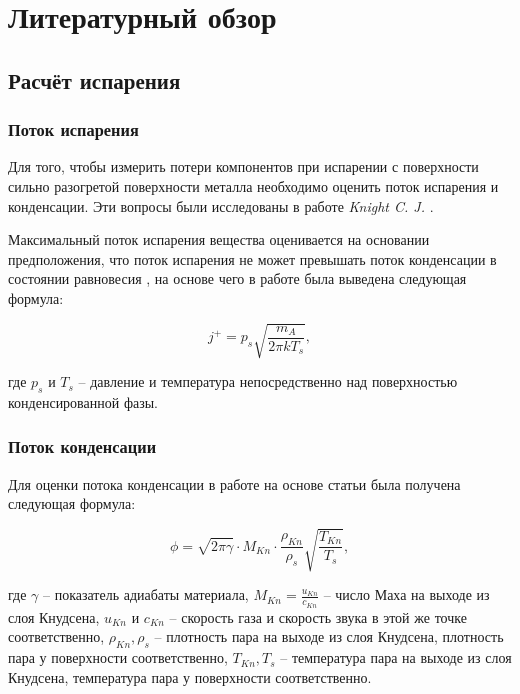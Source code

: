 \section{Литературный обзор}

\subsection{Расчёт испарения}

\subsubsection{Поток испарения}

Для того, чтобы измерить потери компонентов при испарении с поверхности сильно разогретой поверхности металла необходимо оценить поток испарения и конденсации. 
Эти вопросы были исследованы в работе \textit{Knight C. J.} \cite{knight1979theoretical}. 

Максимальный поток испарения вещества оценивается на основании предположения, что поток испарения не может превышать поток конденсации в состоянии равновесия \cite{hertz1882ueber}, на основе чего в работе \cite{langmuir1913vapor} была выведена следующая формула:

\begin{equation}
\label{eq:evap_max}
    j^+ = p_s\sqrt{\frac{m_A}{2\pi k T_s}},
\end{equation} 

где $p_s$ и $T_s$ -- давление и температура непосредственно над поверхностью конденсированной фазы.

\subsubsection{Поток конденсации}

Для оценки потока конденсации в работе \cite{klassen2018simulation} на основе статьи \cite{knight1979theoretical} была получена следующая формула:

\begin{equation}
    \label{eq:evap_coeff}
    \phi = \sqrt{2\pi\gamma} \cdot M_{Kn} \cdot \frac{\rho_{Kn}}{\rho_s} \sqrt{\frac{T_{Kn}}{T_s}},
\end{equation}

где $\gamma$ -- показатель адиабаты материала, $M_{Kn} = \frac{u_{Kn}}{c_{Kn}}$ -- число Маха на выходе из слоя Кнудсена, $u_{Kn}$ и $c_{Kn}$ -- скорость газа и скорость звука в этой же точке соответственно, $\rho_{Kn}, \rho_s$ -- плотность пара на выходе из слоя Кнудсена, плотность пара у поверхности соответственно, $ T_{Kn}, T_s$ -- температура пара на выходе из слоя Кнудсена, температура пара у поверхности соответственно.

